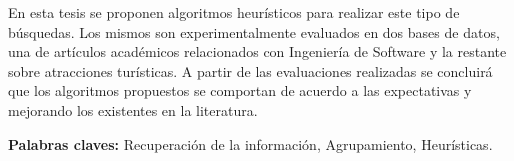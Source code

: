 En esta tesis se proponen algoritmos heurísticos para realizar este tipo de búsquedas. Los mismos son experimentalmente evaluados en dos bases de datos, una de artículos académicos relacionados con Ingeniería de Software y la restante sobre atracciones turísticas. A partir de las evaluaciones realizadas se concluirá que los algoritmos propuestos se comportan de acuerdo a las expectativas y mejorando los existentes en la literatura.
\bigskip



\noindent\textbf{Palabras claves:} Recuperación de la información, Agrupamiento, Heurísticas.